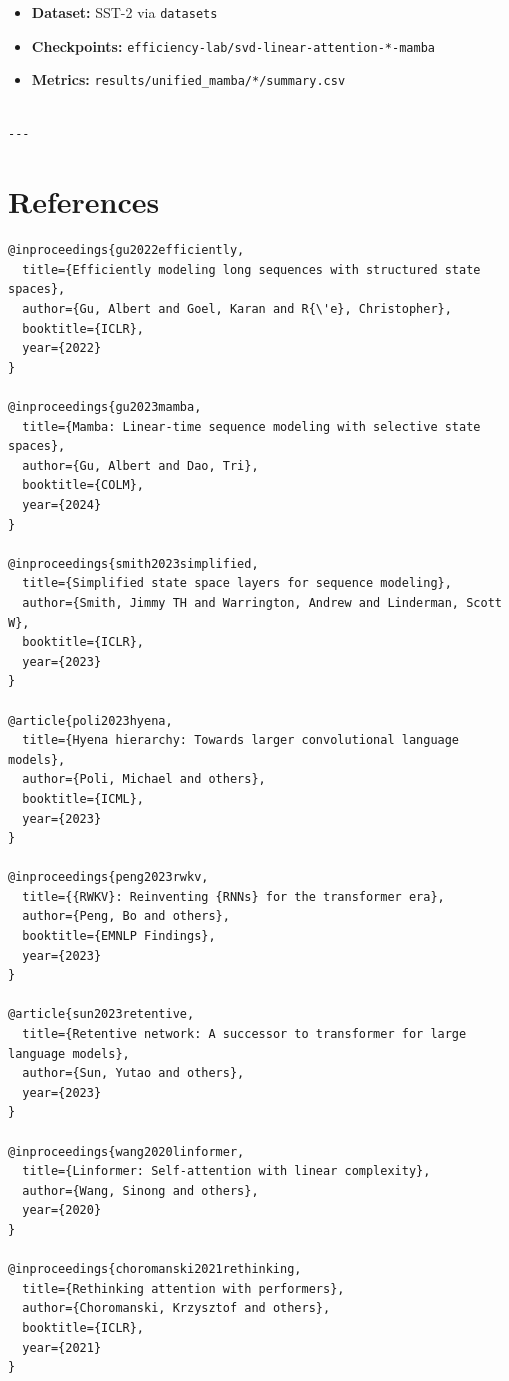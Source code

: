 \begin{itemize}
\item \textbf{Dataset:} SST-2 via \texttt{datasets}
\item \textbf{Checkpoints:} \texttt{efficiency-lab/svd-linear-attention-*-mamba}
\item \textbf{Metrics:} \texttt{results/unified\_mamba/*/summary.csv}
\end{itemize}
\begin{lstlisting}

---
\end{lstlisting}

\section{References}

\begin{lstlisting}
@inproceedings{gu2022efficiently,
  title={Efficiently modeling long sequences with structured state spaces},
  author={Gu, Albert and Goel, Karan and R{\'e}, Christopher},
  booktitle={ICLR},
  year={2022}
}

@inproceedings{gu2023mamba,
  title={Mamba: Linear-time sequence modeling with selective state spaces},
  author={Gu, Albert and Dao, Tri},
  booktitle={COLM},
  year={2024}
}

@inproceedings{smith2023simplified,
  title={Simplified state space layers for sequence modeling},
  author={Smith, Jimmy TH and Warrington, Andrew and Linderman, Scott W},
  booktitle={ICLR},
  year={2023}
}

@article{poli2023hyena,
  title={Hyena hierarchy: Towards larger convolutional language models},
  author={Poli, Michael and others},
  booktitle={ICML},
  year={2023}
}

@inproceedings{peng2023rwkv,
  title={{RWKV}: Reinventing {RNNs} for the transformer era},
  author={Peng, Bo and others},
  booktitle={EMNLP Findings},
  year={2023}
}

@article{sun2023retentive,
  title={Retentive network: A successor to transformer for large language models},
  author={Sun, Yutao and others},
  year={2023}
}

@inproceedings{wang2020linformer,
  title={Linformer: Self-attention with linear complexity},
  author={Wang, Sinong and others},
  year={2020}
}

@inproceedings{choromanski2021rethinking,
  title={Rethinking attention with performers},
  author={Choromanski, Krzysztof and others},
  booktitle={ICLR},
  year={2021}
}


\end{lstlisting}
